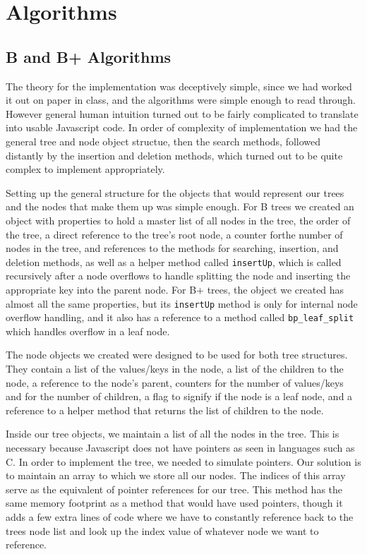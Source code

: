 \section{Algorithms}

\subsection{B and B+ Algorithms}
The theory for the implementation was deceptively simple, since we had worked it out on paper in class, 
and the algorithms were simple enough to read through.  However general human intuition turned out to 
be fairly complicated to translate into usable Javascript code.  In order of complexity of implementation 
we had the general tree and node object structue, then the search methods, followed distantly by the insertion 
and deletion methods, which turned out to be quite complex to implement appropriately.

    Setting up the general structure for the objects that would represent our trees and the nodes that make them up 
was simple enough.  For B trees we created an object with properties to hold a master list of all nodes in the tree, 
the order of the tree, a direct reference to the tree's root node, a counter forthe number of nodes in the tree, and 
references to the methods for searching, insertion, and deletion methods, as well as a helper method called \texttt{insertUp}, 
which is called recursively after a node overflows to handle splitting the node and inserting the appropriate key into 
the parent node.  For B+ trees, the object we created has almost all the same properties, but its \texttt{insertUp} method is 
only for internal node overflow handling, and it also has a reference to a method called \texttt{bp\_leaf\_split} which handles 
overflow in a leaf node.

The node objects we created were designed to be used for both tree structures.  They contain a list of the values/keys 
in the node, a list of the children to the node, a reference to the node's parent, counters for the number of values/keys 
and for the number of children, a flag to signify if the node is a leaf node, and a reference to a helper method that returns 
the list of children to the node.

Inside our tree objects, we maintain a list of all the nodes in the
tree. This is necessary because Javascript does not have pointers as
seen in languages such as C. In order to implement the tree, we needed
to simulate pointers. Our solution is to maintain an array to which we
store all our nodes. The indices of this array serve as the equivalent
of pointer references for our tree. This method has the same memory footprint as a method that would have used pointers, 
though it adds a few extra lines of code where we have to constantly reference back to the trees node list and look up the index
 value of whatever node we want to reference.

